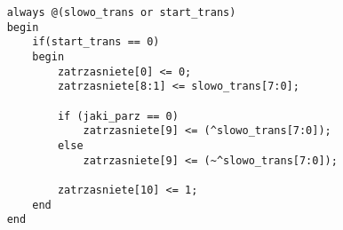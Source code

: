 \begin{lstlisting}
	always @(slowo_trans or start_trans)
	begin
		if(start_trans == 0)
		begin
			zatrzasniete[0] <= 0;
			zatrzasniete[8:1] <= slowo_trans[7:0];
			
			if (jaki_parz == 0)
				zatrzasniete[9] <= (^slowo_trans[7:0]);
			else
				zatrzasniete[9] <= (~^slowo_trans[7:0]);
			
			zatrzasniete[10] <= 1;
		end
	end
\end{lstlisting}